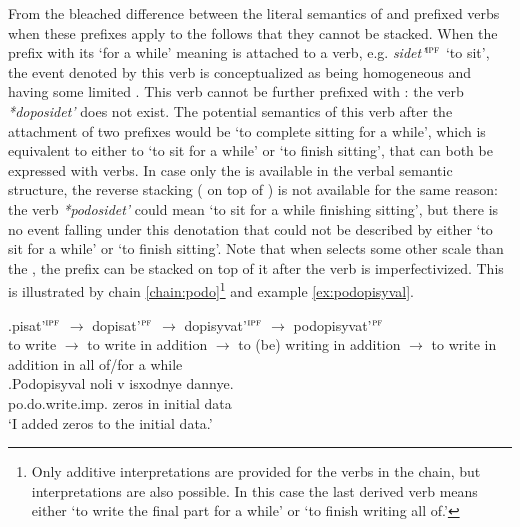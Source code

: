 From the bleached difference between the literal semantics of  and prefixed verbs when these prefixes apply to the  follows that they cannot be stacked. When the prefix  with its `for a while' meaning is attached to a verb, e.g. \textit{sidet'}$^{\textsc{ipf}}$ `to sit', the event denoted by this verb is conceptualized as being homogeneous and having some limited . This verb cannot be further prefixed with : the verb \textit{*doposidet'} does not exist. The potential semantics of this verb after the attachment of two prefixes would be `to complete sitting for a while', which is equivalent to either to `to sit for a while' or `to finish sitting', that can both be expressed with  verbs. In case only the  is available in the verbal semantic structure, the reverse stacking ( on top of ) is not available for the same reason: the verb \textit{*podosidet'} could mean `to sit for a while finishing sitting', but there is no event falling under this denotation that could not be described by either `to sit for a while' or `to finish sitting'. Note that when  selects some other scale than the , the prefix  can be stacked on top of it after the verb is imperfectivized. This is illustrated by chain \ref{chain:podo}\footnote{Only additive interpretations are provided for the verbs in the chain, but  interpretations are also possible. In this case the last derived verb means either `to write the final part for a while' or `to finish writing all of.'} and example \ref{ex:podopisyval}.

\exg.\label{chain:podo}pisat'$^{\textsc{ipf}}$ $\rightarrow$ dopisat'$^{\textsc{pf}}$ $\rightarrow$ dopisyvat'$^{\textsc{ipf}}$ $\rightarrow$ podopisyvat'$^{\textsc{pf}}$\\
{to write} $\rightarrow$ {to write in addition} $\rightarrow$ {to (be) writing in addition} $\rightarrow$ {to write in addition in all of/for a while}\\

\exg.\label{ex:podopisyval}Podopisyval noli v isxodnye dannye.\\
po.do.write.imp. zeros in initial data\\
\trans `I added zeros to the initial data.'

